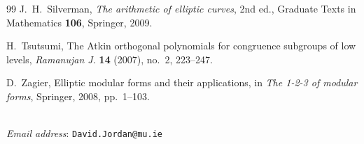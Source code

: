 \documentclass[11pt,a4paper]{article}
\theoremstyle{definition}
\theoremstyle{remark}
\numberwithin{equation}{section}
\begin{document}
\begin{thebibliography}{99}
J.~H.~Silverman, \emph{The arithmetic of elliptic curves}, 2nd ed.,
Graduate Texts in Mathematics \textbf{106}, Springer, 2009.

H.~Tsutsumi, The Atkin orthogonal polynomials for congruence subgroups of
low levels, \emph{Ramanujan J.} \textbf{14} (2007), no.~2, 223--247.

D.~Zagier, Elliptic modular forms and their applications, in
\emph{The 1-2-3 of modular forms}, Springer, 2008, pp.~1--103.

\end{thebibliography}

\bigskip
{}\\
\emph{Email address}: \texttt{David.Jordan@mu.ie}
\end{document}
